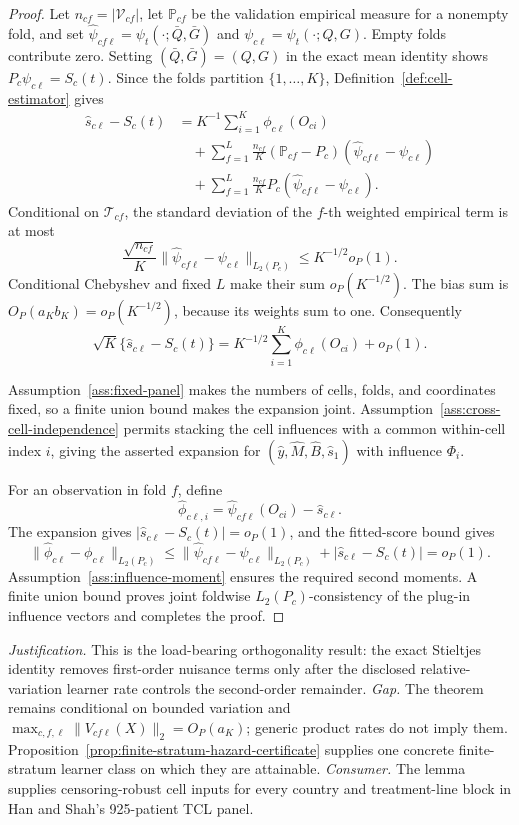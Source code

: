 \documentclass{article}
\begin{document}
\begin{proof}
Let \(n_{cf}=|\mathcal V_{cf}|\), let \(\mathbb P_{cf}\) be the validation empirical measure for a nonempty fold, and set \(\widehat\psi_{cf\ell}=\psi_t(\mathord\cdot;\bar Q,\bar G)\) and \(\psi_{c\ell}=\psi_t(\mathord\cdot;Q,G)\). Empty folds contribute zero. Setting \((\bar Q,\bar G)=(Q,G)\) in the exact mean identity shows \(P_c\psi_{c\ell}=S_c(t)\). Since the folds partition \(\{1,\ldots,K\}\), Definition~\ref{def:cell-estimator} gives
\[
\begin{aligned}
 \widehat s_{c\ell}-S_c(t)
 &=K^{-1}\sum_{i=1}^K\phi_{c\ell}(O_{ci})\\
 &\quad+\sum_{f=1}^L\frac{n_{cf}}K
 (\mathbb P_{cf}-P_c)(\widehat\psi_{cf\ell}-\psi_{c\ell})\\
 &\quad+\sum_{f=1}^L\frac{n_{cf}}K
 P_c(\widehat\psi_{cf\ell}-\psi_{c\ell}).
\end{aligned}
\]
Conditional on \(\mathcal T_{cf}\), the standard deviation of the \(f\)-th weighted empirical term is at most
\[
 \frac{\sqrt{n_{cf}}}{K}
 \|\widehat\psi_{cf\ell}-\psi_{c\ell}\|_{L_2(P_c)}
 \le K^{-1/2}o_P(1).
\]
Conditional Chebyshev and fixed \(L\) make their sum \(o_P(K^{-1/2})\). The bias sum is \(O_P(a_Kb_K)=o_P(K^{-1/2})\), because its weights sum to one. Consequently
\[
 \sqrt K\{\widehat s_{c\ell}-S_c(t)\}
 =K^{-1/2}\sum_{i=1}^K\phi_{c\ell}(O_{ci})+o_P(1).
\]

Assumption~\ref{ass:fixed-panel} makes the numbers of cells, folds, and coordinates fixed, so a finite union bound makes the expansion joint. Assumption~\ref{ass:cross-cell-independence} permits stacking the cell influences with a common within-cell index \(i\), giving the asserted expansion for \((\widehat y,\widehat M,\widehat B,\widehat s_1)\) with influence \(\Phi_i\).

For an observation in fold \(f\), define
\[
 \widehat\phi_{c\ell,i}=\widehat\psi_{cf\ell}(O_{ci})-\widehat s_{c\ell}.
\]
The expansion gives \(|\widehat s_{c\ell}-S_c(t)|=o_P(1)\), and the fitted-score bound gives
\[
 \|\widehat\phi_{c\ell}-\phi_{c\ell}\|_{L_2(P_c)}
 \le\|\widehat\psi_{cf\ell}-\psi_{c\ell}\|_{L_2(P_c)}
 +|\widehat s_{c\ell}-S_c(t)|=o_P(1).
\]
Assumption~\ref{ass:influence-moment} ensures the required second moments. A finite union bound proves joint foldwise \(L_2(P_c)\)-consistency of the plug-in influence vectors and completes the proof.
\end{proof}
\par\smallskip\noindent \textit{Justification.} This is the load-bearing orthogonality result: the exact Stieltjes identity removes first-order nuisance terms only after the disclosed relative-variation learner rate controls the second-order remainder. \textit{Gap.} The theorem remains conditional on bounded variation and \(\max_{c,f,\ell}\|V_{cf\ell}(X)\|_2=O_P(a_K)\); generic product rates do not imply them. Proposition~\ref{prop:finite-stratum-hazard-certificate} supplies one concrete finite-stratum learner class on which they are attainable. \textit{Consumer.} The lemma supplies censoring-robust cell inputs for every country and treatment-line block in Han and Shah's 925-patient TCL panel.
\end{document}
